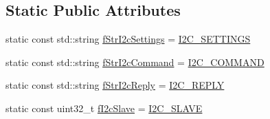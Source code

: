 \subsection*{Static Public Attributes}
\begin{DoxyCompactItemize}
\item 
static const std\-::string \hyperlink{class_ph2___hw_interface_1_1_cbc_interface_ab45dcb5563c94075ac0a3e17d17c1fd4}{f\-Str\-I2c\-Settings} = \hyperlink{_definition_8h_a15db09e24617ea5c5843213672ac8a03}{I2\-C\-\_\-\-S\-E\-T\-T\-I\-N\-G\-S}
\item 
static const std\-::string \hyperlink{class_ph2___hw_interface_1_1_cbc_interface_a350e32baca2a50220eeff24b9fa07054}{f\-Str\-I2c\-Command} = \hyperlink{_definition_8h_ae308275dafb538f2511ea285fea768d0}{I2\-C\-\_\-\-C\-O\-M\-M\-A\-N\-D}
\item 
static const std\-::string \hyperlink{class_ph2___hw_interface_1_1_cbc_interface_a6a0730099e121a7707615ba6969afe80}{f\-Str\-I2c\-Reply} = \hyperlink{_definition_8h_a46aaa2293185dfc3cd655f65bea7f614}{I2\-C\-\_\-\-R\-E\-P\-L\-Y}
\item 
static const uint32\-\_\-t \hyperlink{class_ph2___hw_interface_1_1_cbc_interface_ad5257bb9fac0efe9cb8307a04f51ef77}{f\-I2c\-Slave} = \hyperlink{_definition_8h_ab15137f7c592d05573de99f078516157}{I2\-C\-\_\-\-S\-L\-A\-V\-E}
\end{DoxyCompactItemize}

